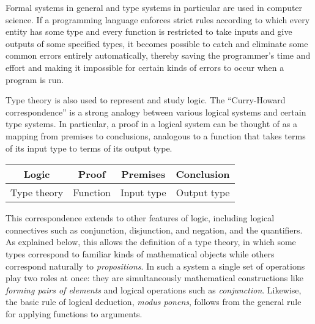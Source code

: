 Formal systems in general and type systems in particular are used in computer science. 
If a programming language enforces 
strict rules according to which every entity has some type and every function is restricted to take inputs and give outputs of some specified types, it becomes possible to catch and eliminate some common errors entirely automatically, thereby saving the programmer's time and effort and making it impossible for certain kinds of errors to occur when a program is run.

Type theory is also used to represent and study logic. 
The ``Curry-Howard correspondence'' is a strong analogy between various logical systems and certain type systems. In particular, a proof in a logical system can be thought of as a mapping from premises to conclusions, analogous to a function that takes terms of its input type to terms of its output type.

\begin{table}[htp]
\centering
\begin{tabular}{|c|c|c|c|}
\hline
Logic	&	Proof	&	Premises	&	Conclusion \\
\hline
Type theory	&	Function	&	Input type	&	Output type	\\
\hline
\end{tabular}
\end{table}

This correspondence extends to other features of logic, including logical connectives such as conjunction, disjunction, and negation, and the quantifiers. As explained below, this allows the definition of a type theory, in which some types correspond to familiar kinds of mathematical objects while others correspond naturally to \emph{propositions}. In such a system a single set of operations play two roles at once: they are simultaneously mathematical constructions like \emph{forming pairs of elements} and logical operations such as \emph{conjunction}. Likewise, the basic rule of logical deduction, \emph{modus ponens}, follows from the general rule for applying functions to arguments.


